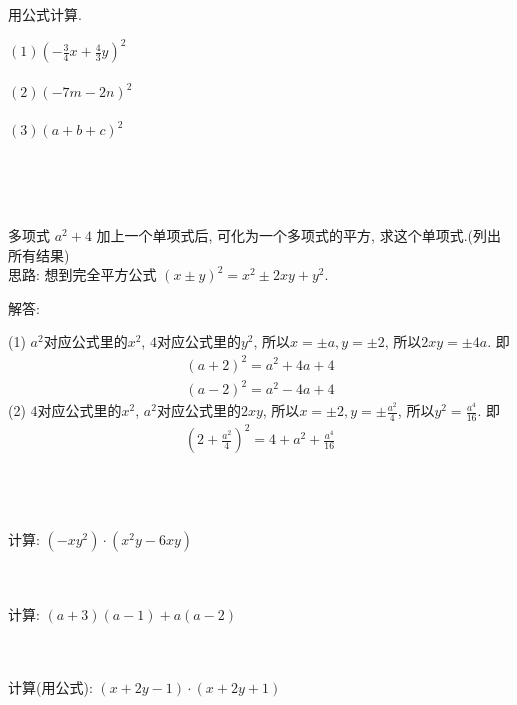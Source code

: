 \item {
    用公式计算.

    $(1) (-\frac34 x + \frac43 y)^2$ \\ \\

    $(2) (-7m-2n)^2$ \\ \\
    
    $(3) (a+b+c)^2$ \\ \\
}
\\ \\

\item {
    多项式 $a^2 + 4$ 加上一个单项式后, 可化为一个多项式的平方, 求这个单项式.(列出所有结果)
    \ifshowSolution
    \fangsong{}
    \\
    思路: 想到完全平方公式 $(x\pm y)^2 = x^2 \pm 2xy + y^2$.

    解答: 

    (1) $a^2$对应公式里的$x^2$, $4$对应公式里的$y^2$, 所以$x= \pm a, y= \pm 2$, 所以$2xy = \pm 4a$. 即
    \begin{align*}
        (a+2)^2 = a^2 + 4a + 4 \\
        (a-2)^2 = a^2 - 4a + 4
    \end{align*}
    (2) $4$对应公式里的$x^2$, $a^2$对应公式里的$2xy$, 所以$x= \pm 2, y=\pm \frac{a^2}{4}$, 所以$y^2 = \frac{a^4}{16}$. 即
    \begin{align*}
        (2 + \frac{a^2}{4})^2 = 4 + a^2 + \frac{a^4}{16}
    \end{align*}
    \else
        \\ \\ \\
    \fi
}

\item {
    计算: $(-xy^2)\cdot (x^2y - 6xy)$
}
\\ \\ \\

\item {
    计算: $(a+3)(a-1) + a(a-2)$
}
\\ \\ \\

\item {
    计算(用公式): $(x+2y-1)\cdot (x+2y+1)$
}
\\ \\ \\

